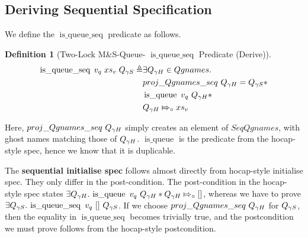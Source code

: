 \documentclass[a4paper, 11pt]{report}
\newtheorem{definition}{Definition}[section]
\newcommand{\tlmsq}{Two-Lock M\&S-Queue\xspace}
\newcommand{\isqueue}{\operatorname{is\_queue}}
\newcommand{\isqueueseq}{\operatorname{is\_queue\_seq}}
\newcommand{\SeqQgnames}{SeqQgnames}
\newcommand{\Qgnames}{Qgnames}
\newcommand{\abstractstatefullfrag}[2]{#1 \Mapsto_{\circ} #2}
\begin{document}
\subsection{Deriving Sequential Specification}
We define the $\isqueueseq$ predicate as follows.
\begin{definition}[\tlmsq - $\isqueueseq$ Predicate (Derive)]\label{TLMSQ:spec:isqueueseq_derive}
\begin{align*}
  \isqueueseq \; v_q \; xs_v \; Q_{\gname S} \eqdef
    &\Exists Q_{\gname H} \in \Qgnames .\\
    &proj\_Qgnames\_seq \ Q_{\gname H} = Q_{\gname S} \star\\
    &\isqueue \ v_q \ Q_{\gname H} \star\\
    &\abstractstatefullfrag{Q_{\gname H}}{xs_v}
\end{align*}
\end{definition}

Here, $proj\_Qgnames\_seq \ Q_{\gamma H}$ simply creates an element of $\SeqQgnames$, with ghost names matching those of $Q_{\gamma H}$.
$\isqueue$ is the predicate from the hocap-style spec, hence we know that it is duplicable.

The \textbf{sequential initialise spec} follows almost directly from hocap-style initialise spec. They only differ in the post-condition. The post-condition in the hocap-style spec states $\Exists Q_{\gname H} . \isqueue\ v_q \ Q_{\gname H} \star \abstractstatefullfrag{Q_{\gname H}}{[]}$, whereas we have to prove $\Exists Q_{\gname S}. \isqueueseq\ v_q\ []\ Q_{\gname S}$. If we choose $proj\_Qgnames\_seq \ Q_{\gamma H}$ for $Q_{\gamma S}$, then the equality in $\isqueueseq$ becomes trivially true, and the postcondition we must prove follows from the hocap-style postcondition.
\end{document}
